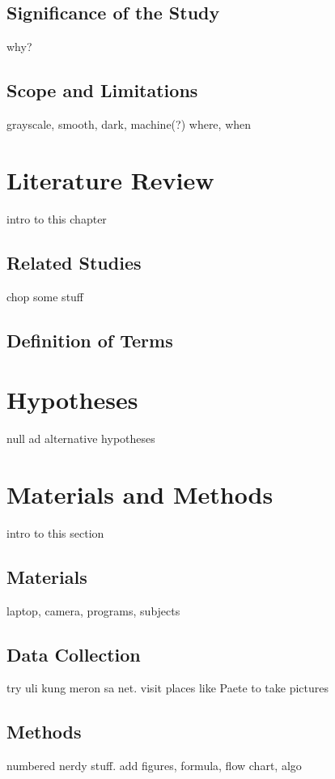 \documentclass[journal]{./IEEE/IEEEtran}
\begin{document}
\subsection{Significance of the Study}
why?

\subsection{Scope and Limitations}
grayscale, smooth, dark, machine(?)
where, when

\section{Literature Review}
intro to this chapter

\subsection{Related Studies}
chop some stuff

\subsection{Definition of Terms}

\section{Hypotheses}
null ad alternative hypotheses

\section{Materials and Methods}
intro to this section

\subsection{Materials}
laptop, camera, programs, subjects

\subsection{Data Collection}
try uli kung meron sa net. visit places like Paete to take pictures

\subsection{Methods}
numbered nerdy stuff. add figures, formula, flow chart, algo
\end{document}
